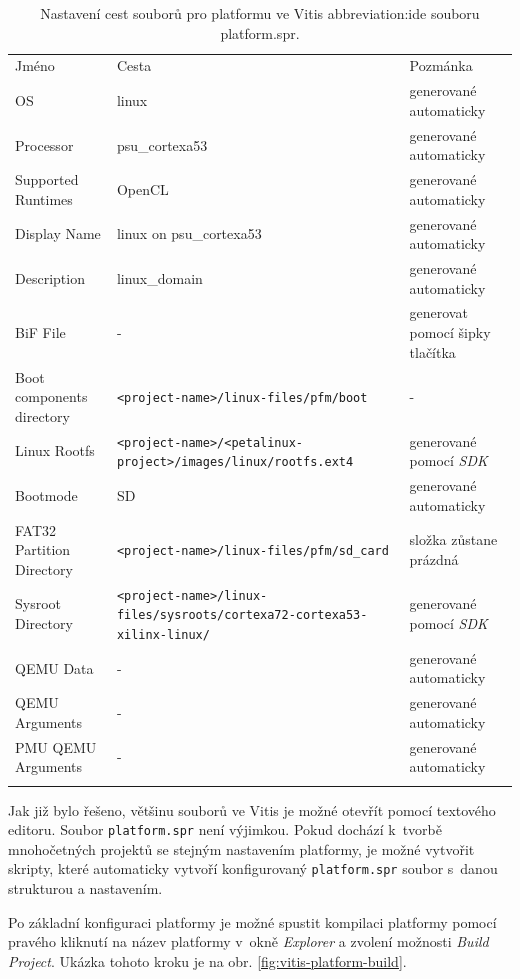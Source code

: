 \documentclass[a4paper, twoside, 11pt]{article}
\begin{document}
		\begin{table}[H]
			\centering
			\caption{Nastavení cest souborů pro platformu ve Vitis \gls{abbreviation:ide} souboru platform.spr.}
		  \vspace*{0.15cm}
		  \resizebox{\textwidth}{!}
		  {
			\begin{tabular}{!{\vrule width 2pt} l | l | l !{\vrule width 2pt}}
			Jméno & Cesta & Pozmánka\\
			OS & linux & generované automaticky\\ \hline
			Processor & psu\_cortexa53 & generované automaticky\\ \hline
			Supported Runtimes & OpenCL & generované automaticky\\ \hline
			Display Name & linux on psu\_cortexa53 & generované automaticky \\\hline
			Description & linux\_domain & generované automaticky\\ \hline
			BiF File & - & generovat pomocí šipky tlačítka\\ \hline
			Boot components directory & \texttt{<project-name>/linux-files/pfm/boot} & -\\ \hline
			Linux Rootfs & \texttt{<project-name>/<petalinux-project>/images/linux/rootfs.ext4} & generované pomocí \textit{SDK}\\ \hline
			Bootmode & SD & generované automaticky\\ \hline
			FAT32 Partition Directory & \texttt{<project-name>/linux-files/pfm/sd\_card} & složka zůstane prázdná\\ \hline
			Sysroot Directory & \texttt{<project-name>/linux-files/sysroots/cortexa72-cortexa53-xilinx-linux/} & generované pomocí \textit{SDK}\\ \hline
			QEMU Data & - & generované automaticky \\ \hline
			QEMU Arguments & - & generované automaticky \\ \hline
			PMU QEMU Arguments & - & generované automaticky \\
			\end{tabular}
		  }
			\label{tab:vitis-platform-spr-settings}
		\end{table}

		Jak již bylo řešeno, většinu souborů ve Vitis je možné otevřít pomocí textového editoru. Soubor \texttt{platform.spr} není výjimkou. Pokud dochází k~tvorbě mnohočetných projektů se stejným nastavením platformy, je možné vytvořit skripty, které automaticky vytvoří konfigurovaný \texttt{platform.spr} soubor s~danou strukturou a nastavením.\par
		Po základní konfiguraci platformy je možné spustit kompilaci platformy pomocí pravého kliknutí na název platformy v~okně \textit{Explorer} a zvolení možnosti \textit{Build Project}. Ukázka tohoto kroku je na obr. \ref{fig:vitis-platform-build}.
\end{document}
